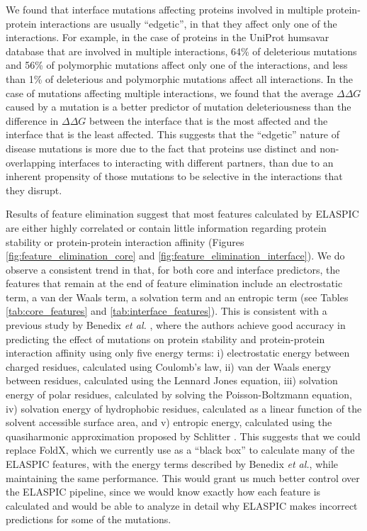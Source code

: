 We found that interface mutations affecting proteins involved in multiple protein-protein interactions are usually ``edgetic'', in that they affect only one of the interactions. For example, in the case of proteins in the UniProt humsavar database that are involved in multiple interactions, 64\% of deleterious mutations and 56\% of polymorphic mutations affect only one of the interactions, and less than 1\% of deleterious and polymorphic mutations affect all interactions. In the case of mutations affecting multiple interactions, we found that the average $\Delta \Delta G$ caused by a mutation is a better predictor of mutation deleteriousness than the difference in $\Delta \Delta G$ between the interface that is the most affected and the interface that is the least affected. This suggests that the ``edgetic'' nature of disease mutations is more due to the fact that proteins use distinct and non-overlapping interfaces to interacting with different partners, than due to an inherent propensity of those mutations to be selective in the interactions that they disrupt.

Results of feature elimination suggest that most features calculated by ELASPIC are either highly correlated or contain little information regarding protein stability or protein-protein interaction affinity (Figures \ref{fig:feature_elimination_core} and \ref{fig:feature_elimination_interface}). We do observe a consistent trend in that, for both core and interface predictors, the features that remain at the end of feature elimination include an electrostatic term, a van der Waals term, a solvation term and an entropic term (see Tables \ref{tab:core_features} and \ref{tab:interface_features}). This is consistent with a previous study by Benedix \textit{et al.} \cite{benedix_predicting_2009}, where the authors achieve good accuracy in predicting the effect of mutations on protein stability and protein-protein interaction affinity using only five energy terms: i) electrostatic energy between charged residues, calculated using Coulomb's law, ii) van der Waals energy between residues, calculated using the Lennard Jones equation, iii) solvation energy of polar residues, calculated by solving the Poisson-Boltzmann equation, iv) solvation energy of hydrophobic residues, calculated as a linear function of the solvent accessible surface area, and v) entropic energy, calculated using the quasiharmonic approximation proposed by Schlitter \cite{schlitter_estimation_1993}. This suggests that we could replace FoldX, which we currently use as a ``black box'' to calculate many of the ELASPIC features, with the energy terms described by Benedix \textit{et al.}, while maintaining the same performance. This would grant us much better control over the ELASPIC pipeline, since we would know exactly how each feature is calculated and would be able to analyze in detail why ELASPIC makes incorrect predictions for some of the mutations.


